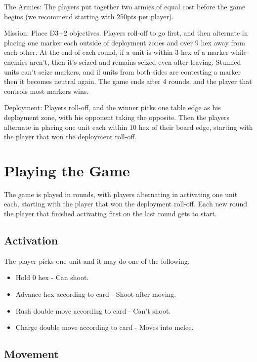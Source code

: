 \documentclass[6pt]{scrreport}
\begin{document}
  The Armies: The players put together
  two armies of equal cost before the
  game begins (we recommend starting
  with 250pts per player).

  Mission: Place D3+2 objectives. Players
  roll-off to go first, and then alternate in
  placing one marker each outside of
  deployment zones and over 9 hex away
  from each other. At the end of each
  round, if a unit is within 3 hex of a marker
  while enemies aren’t, then it’s seized
  and remains seized even after leaving.
  Stunned units can’t seize markers, and if
  units from both sides are contesting a
  marker then it becomes neutral again.
  The game ends after 4 rounds, and the
  player that controls most markers wins.

  Deployment: Players roll-off, and the
  winner picks one table edge as his
  deployment zone, with his opponent
  taking the opposite. Then the players
  alternate in placing one unit each within
  10 hex of their board edge, starting with the
  player that won the deployment roll-off.

  \chapter*{Playing the Game}

  The game is played in rounds, with
  players alternating in activating one unit
  each, starting with the player that won
  the deployment roll-off. Each new round
  the player that finished activating first
  on the last round gets to start.

  \section*{Activation}

  The player picks one unit and it may do
  one of the following:
  \begin{itemize}
    \item  Hold 0 hex - Can shoot.
    \item  Advance hex according to card - Shoot after moving.
    \item  Rush double move according to card - Can’t shoot.
    \item  Charge double move according to card - Moves into melee.
  \end{itemize}

  \section*{Movement}
\end{document}
